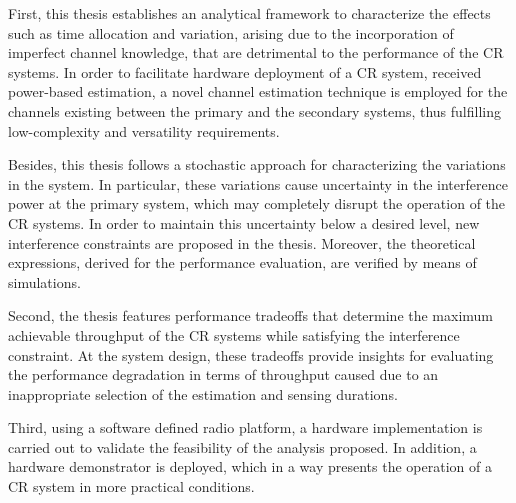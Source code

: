 First, this thesis establishes an analytical framework to characterize the effects such as time allocation and variation, arising due to the incorporation of imperfect channel knowledge, that are detrimental to the performance of the CR systems. In order to facilitate hardware deployment of a CR system, received power-based estimation, a novel channel estimation technique is employed for the channels existing between the primary and the secondary systems, thus fulfilling low-complexity and versatility requirements. 

Besides, this thesis follows a stochastic approach for characterizing the variations in the system. In particular, these variations cause uncertainty in the interference power at the primary system, which may completely disrupt the operation of the CR systems. In order to maintain this uncertainty below a desired level, new interference constraints are proposed in the thesis. Moreover, the theoretical expressions, derived for the performance evaluation, are verified by means of simulations. 




Second, the thesis features performance tradeoffs that determine the maximum achievable throughput of the CR systems while satisfying the interference constraint. At the system design, these tradeoffs provide insights for evaluating the performance degradation in terms of throughput caused due to an inappropriate selection of the estimation and sensing durations. 

Third, using a software defined radio platform, a hardware implementation is carried out to validate the feasibility of the analysis proposed. In addition, a hardware demonstrator is deployed, which in a way presents the operation of a CR system in more practical conditions. %



\cleardoublepage
